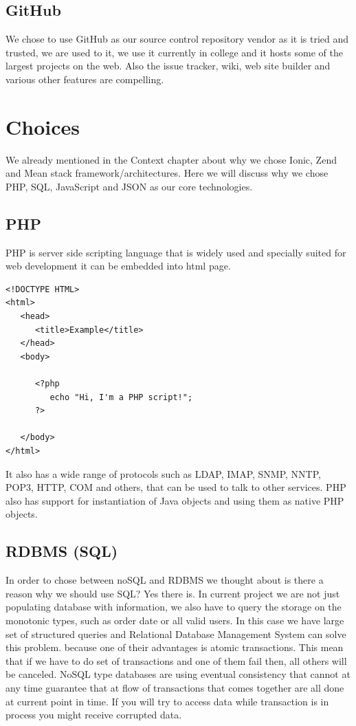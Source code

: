 \subsection{GitHub}
We chose to use GitHub as our source control repository vendor as it is tried and trusted, we are used to it, we use it currently in college and it hosts some of the largest projects on the web. Also the issue tracker, wiki, web site builder and various other features are compelling.

\section{Choices}
We already mentioned in the Context chapter about why we chose Ionic, Zend and Mean stack framework/architectures.
Here we will discuss why we chose PHP, SQL, JavaScript and JSON as our core technologies.
\subsection{PHP}
PHP is server side scripting language that is widely used and specially suited for web development it can be embedded into html page.

\begin{verbatim}
<!DOCTYPE HTML>
<html>
   <head>
      <title>Example</title>
   </head>
   <body>
	
      <?php
         echo "Hi, I'm a PHP script!";
      ?>
	
   </body>
</html>
\end{verbatim}

It also has a wide range of protocols such as LDAP, IMAP, SNMP, NNTP, POP3, HTTP, COM and others, that can be used to talk to other services. PHP also has support for instantiation of Java objects and using them as native PHP objects.

\subsection{RDBMS (SQL)}
In order to chose between noSQL and RDBMS we thought about is there a reason why we should use SQL? Yes there is. In current project we are not just populating database with information, we also have to query the storage on the monotonic types, such as order date or all valid users. In this case we have large set of structured queries and Relational Database Management System can solve this problem. because one of their advantages is atomic transactions. This mean that if we have to do set of transactions and one of them fail then, all others will be canceled. NoSQL type databases are using eventual consistency that cannot at any time guarantee that at flow of transactions that comes together are all done at current point in time. If you will try to access data while transaction is in process you might receive corrupted data. 



